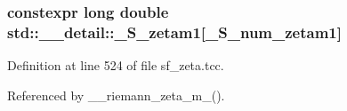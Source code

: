 \subsubsection[{\texorpdfstring{\+\_\+\+S\+\_\+zetam1}{_S_zetam1}}]{\setlength{\rightskip}{0pt plus 5cm}constexpr long double std\+::\+\_\+\+\_\+detail\+::\+\_\+\+S\+\_\+zetam1\mbox{[}{\bf \+\_\+\+S\+\_\+num\+\_\+zetam1}\mbox{]}}\hypertarget{namespacestd_1_1____detail_a22ed80d9e5c3bc79e61a3cdb8e79a462}{}\label{namespacestd_1_1____detail_a22ed80d9e5c3bc79e61a3cdb8e79a462}


Definition at line 524 of file sf\+\_\+zeta.\+tcc.



Referenced by \+\_\+\+\_\+riemann\+\_\+zeta\+\_\+m\+\_().

